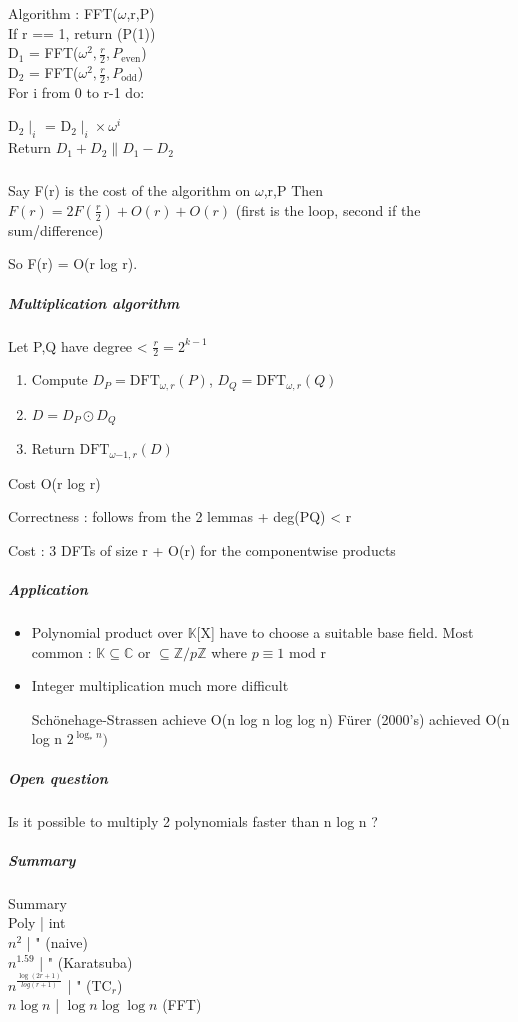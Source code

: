 \documentclass{article}
\theoremstyle{definition}
\theoremstyle{remark}
\begin{document}
Algorithm : FFT($\omega$,r,P)\\
If r == 1, return (P(1))\\
D$_1$ = FFT($\omega^2,\frac{r}{2},P_{\text{even}}$)\\
D$_2$ = FFT($\omega^2,\frac{r}{2},P_{\text{odd}}$)\\
For i from 0 to r-1 do:


	D$_2\mid_i$ = D$_2\mid_i \times \omega^i$\\
Return $D_1 + D_2 \parallel D_1 - D_2$

\subparagraph{}
Say F(r) is the cost of the algorithm on $\omega$,r,P
Then $F(r) = 2F(\frac{r}{2}) + O(r) + O(r)$ (first is the loop, second if the sum/difference)

So F(r) = O(r log r).

\subparagraph{Multiplication algorithm}
Let P,Q have degree < $\frac{r}{2} = 2^{k-1}$
\begin{enumerate}
	\item Compute $D_P = \text{DFT}_{\omega,r}(P)$, $D_Q = \text{DFT}_{\omega,r}(Q)$
	\item $D = D_P \odot D_Q$
	\item Return $\text{DFT}_{\omega{-1},r}(D)$
\end{enumerate}
Cost O(r log r)

Correctness : follows from the 2 lemmas + deg(PQ) < r

Cost : 3 DFTs of size r + O(r) for the componentwise products

\subparagraph{Application}
\begin{itemize}
	\item Polynomial product over $\mathbb{K}$[X] have to choose a suitable base field.
	Most common :
	$\mathbb{K} \subseteq \mathbb{C}$ or $\subseteq \mathbb{Z}/p\mathbb{Z}$ where $p \equiv 1$ mod r
	\item Integer multiplication much more difficult
	
	Schönehage-Strassen achieve O(n log n log log n)
	Fürer (2000's) achieved O(n log n $2 ^{\log_* n})$
\end{itemize}
\subparagraph{Open question}
	Is it possible to multiply 2 polynomials faster than n log n ?
\subparagraph{Summary}
Summary\\
Poly | int\\
$n^2$ |  " (naive)\\
$n^{1.59}$ | " (Karatsuba)\\
$n^{\frac{\log(2r+1)}{log(r+1)}}$ | " (TC$_r$)\\
$n \log n$ | $ \log n \log \log n$ (FFT)\\
\end{document}
